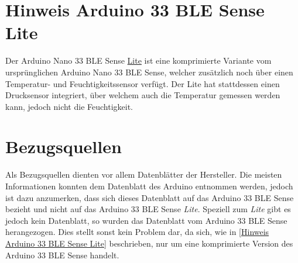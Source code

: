 \section{Hinweis Arduino 33 BLE Sense Lite \label{Hinweis Arduino 33 BLE Sense Lite}}
Der Arduino Nano 33 BLE Sense \underline{Lite} ist eine komprimierte Variante vom ursprünglichen Arduino Nano 33 BLE Sense, welcher zusätzlich noch über einen Temperatur- und Feuchtigkeitssensor verfügt. Der Lite hat stattdessen einen Drucksensor integriert, über welchem auch die Temperatur gemessen werden kann, jedoch nicht die Feuchtigkeit.\cite{PetrFilipi.2022}
\section{Bezugsquellen}
Als Bezugsquellen dienten vor allem Datenblätter der Hersteller. Die meisten Informationen konnten dem Datenblatt des Arduino entnommen werden, jedoch ist dazu anzumerken, dass sich dieses Datenblatt auf das Arduino 33 BLE Sense bezieht und nicht auf das Arduino 33 BLE Sense \emph{Lite}. Speziell zum \emph{Lite} gibt es jedoch kein Datenblatt, so wurden das Datenblatt vom Arduino 33 BLE Sense herangezogen. Dies stellt sonst kein Problem dar, da sich, wie in \ref{Hinweis Arduino 33 BLE Sense Lite} beschrieben, nur um eine komprimierte Version des Arduino 33 BLE Sense handelt.


